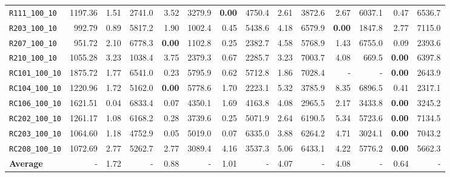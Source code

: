\begin{table}[ht]
\begin{adjustbox}{width=\textwidth}
\begin{tabular}{l r r r @{\hspace{8pt}} r r @{\hspace{8pt}} r r @{\hspace{8pt}} r r @{\hspace{8pt}} r r @{\hspace{8pt}} r r @{\hspace{8pt}}}
\texttt{R111\_100\_10} & 1197.36 & 1.51 & 2741.0 & 3.52 & 3279.9 & \textbf{0.00} & 4750.4 & 2.61 & 3872.6 & 2.67 & 6037.1 & 0.47 & 6536.7 \\
\texttt{R203\_100\_10} & 992.79 & 0.89 & 5817.2 & 1.90 & 1002.4 & 0.45 & 5438.6 & 4.18 & 6579.9 & \textbf{0.00} & 1847.8 & 2.77 & 7115.0 \\
\texttt{R207\_100\_10} & 951.72 & 2.10 & 6778.3 & \textbf{0.00} & 1102.8 & 0.25 & 2382.7 & 4.58 & 5768.9 & 1.43 & 6755.0 & 0.09 & 2393.6 \\
\texttt{R210\_100\_10} & 1055.28 & 3.23 & 1038.4 & 3.75 & 2379.3 & 0.67 & 2285.7 & 3.23 & 7003.7 & 4.08 & 669.5 & \textbf{0.00} & 6397.8 \\
\texttt{RC101\_100\_10} & 1875.72 & 1.77 & 6541.0 & 0.23 & 5795.9 & 0.62 & 5712.8 & 1.86 & 7028.4 & - & - & \textbf{0.00} & 2643.9 \\
\texttt{RC104\_100\_10} & 1220.96 & 1.72 & 5162.0 & \textbf{0.00} & 5778.6 & 1.70 & 2223.1 & 5.32 & 3785.9 & 8.35 & 6896.5 & 0.41 & 2317.1 \\
\texttt{RC106\_100\_10} & 1621.51 & 0.04 & 6833.4 & 0.07 & 4350.1 & 1.69 & 4163.8 & 4.08 & 2965.5 & 2.17 & 3433.8 & \textbf{0.00} & 3245.2 \\
\texttt{RC202\_100\_10} & 1261.17 & 1.08 & 6168.2 & 0.28 & 3739.6 & 0.25 & 5071.9 & 2.64 & 6190.5 & 5.34 & 5723.6 & \textbf{0.00} & 7134.5 \\
\texttt{RC203\_100\_10} & 1064.60 & 1.18 & 4752.9 & 0.05 & 5019.0 & 0.07 & 6335.0 & 3.88 & 6264.2 & 4.71 & 3024.1 & \textbf{0.00} & 7043.2 \\
\texttt{RC208\_100\_10} & 1072.69 & 2.77 & 5262.7 & 2.77 & 3089.4 & 4.16 & 3537.3 & 5.06 & 6433.1 & 4.22 & 5776.2 & \textbf{0.00} & 5662.3 \\
\midrule
\textbf{Average} & - & 1.72 & - & 0.88 & - & 1.01 & - & 4.07 & - & 4.08 & - & 0.64 & - \\
\bottomrule
\end{tabular}
\end{adjustbox}
\end{table}